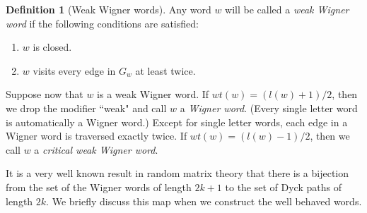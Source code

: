 \documentclass[12pt]{article}
\numberwithin{equation}{section}
\numberwithin{equation}{section}
\theoremstyle{definition}
\newtheorem{definition}{Definition}[section]
\renewcommand{\1}{\bf 1}
\begin{document}
\begin{definition}[Weak Wigner words]
	\label{def:weakwigner}
Any word $w$ will be called a \emph{weak Wigner word} if the following conditions are satisfied:
\begin{enumerate}
\item $w$ is closed.
\item $w$ visits every edge in $G_{w}$ at least twice. 
\end{enumerate}
\end{definition}
Suppose now that $w$ is a weak Wigner word. If $wt(w) = (
l(w) + 1)/2$, then we
drop the modifier ``weak" and call $w$ a \emph{Wigner word}. (Every single letter word is
automatically a Wigner word.) 
Except for single letter words, each edge in a Wigner word is traversed exactly twice.
If $wt(w) = (l(w)-1)/2$, then we call $w$ a \emph{critical
weak Wigner word}.

It is a very well known result in random matrix theory that there is a bijection from the set of the Wigner words of length $2k+1$ to the set of Dyck paths of length $2k$. We briefly discuss this map when we construct the  well behaved words.
\end{document}
